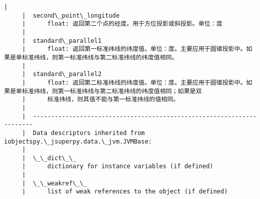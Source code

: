 \documentclass[11pt]{article}
\begin{document}
\begin{Verbatim}[commandchars=\\\{\}]
     |  
     |  second\_point\_longitude
     |      float: 返回第二个点的经度。用于方位投影或斜投影。单位：度
     |  
     |  standard\_parallel1
     |      float: 返回第一标准纬线的纬度值。单位：度。主要应用于圆锥投影中。如果是单标准纬线，则第一标准纬线与第二标准纬线的纬度值相同。
     |  
     |  standard\_parallel2
     |      float: 返回第二标准纬线的纬度值。单位：度。主要应用于圆锥投影中。如果是单标准纬线，则第一标准纬线与第二标准纬线的纬度值相同；如果是双
     |      标准纬线，则其值不能与第一标准纬线的值相同。
     |  
     |  ----------------------------------------------------------------------
     |  Data descriptors inherited from iobjectspy.\_jsuperpy.data.\_jvm.JVMBase:
     |  
     |  \_\_dict\_\_
     |      dictionary for instance variables (if defined)
     |  
     |  \_\_weakref\_\_
     |      list of weak references to the object (if defined)
    

\end{Verbatim}
\end{document}
